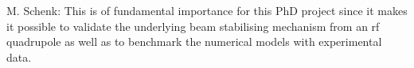 
M. Schenk:
This is of fundamental importance for this PhD project since it makes it possible to
validate the underlying beam stabilising mechanism from an rf quadrupole as well as to benchmark
the numerical models with experimental data.